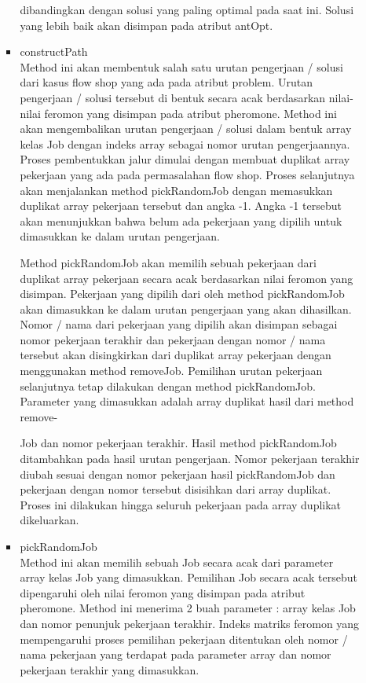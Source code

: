 \begin{itemize}
\begin{itemize}
\begin{itemize}
				dibandingkan dengan solusi yang paling optimal pada saat ini. Solusi yang lebih baik
				akan disimpan pada atribut antOpt.
				\item constructPath \\
				Method ini akan membentuk salah satu urutan pengerjaan / solusi dari kasus flow shop 
				yang ada pada atribut problem. Urutan pengerjaan / solusi tersebut di
				bentuk secara acak berdasarkan nilai-nilai feromon yang disimpan pada atribut pheromone.
				Method ini akan mengembalikan urutan pengerjaan / solusi dalam bentuk
				array kelas Job dengan indeks array sebagai nomor urutan pengerjaannya.
				Proses pembentukkan jalur dimulai dengan membuat duplikat array pekerjaan yang
				ada pada permasalahan flow shop. Proses selanjutnya akan menjalankan
				method pickRandomJob dengan memasukkan duplikat array pekerjaan tersebut dan
				angka -1. Angka -1 tersebut akan menunjukkan bahwa belum ada pekerjaan yang
				dipilih untuk dimasukkan ke dalam urutan pengerjaan.
				
				Method pickRandomJob akan memilih sebuah pekerjaan dari duplikat array pekerjaan
				secara acak berdasarkan nilai feromon yang disimpan. Pekerjaan yang dipilih
				dari oleh method pickRandomJob akan dimasukkan ke dalam urutan pengerjaan
				yang akan dihasilkan. Nomor / nama dari pekerjaan yang dipilih akan disimpan sebagai
				nomor pekerjaan terakhir dan pekerjaan dengan nomor / nama tersebut akan
				disingkirkan dari duplikat array pekerjaan dengan menggunakan method removeJob.
				Pemilihan urutan pekerjaan selanjutnya tetap dilakukan dengan method pickRandomJob.
				Parameter yang dimasukkan adalah array duplikat hasil dari method remove-
				
				Job dan nomor pekerjaan terakhir. Hasil method pickRandomJob ditambahkan pada
				hasil urutan pengerjaan. Nomor pekerjaan terakhir diubah sesuai dengan nomor pekerjaan
				hasil pickRandomJob dan pekerjaan dengan nomor tersebut disisihkan dari
				array duplikat. Proses ini dilakukan hingga seluruh pekerjaan pada array duplikat
				dikeluarkan.
				\item pickRandomJob \\
				Method ini akan memilih sebuah Job secara acak dari parameter array kelas Job
				yang dimasukkan. Pemilihan Job secara acak tersebut dipengaruhi oleh nilai feromon
				yang disimpan pada atribut pheromone. Method ini menerima 2 buah parameter
				: array kelas Job dan nomor penunjuk pekerjaan terakhir. Indeks matriks
				feromon yang mempengaruhi proses pemilihan pekerjaan ditentukan oleh nomor /
				nama pekerjaan yang terdapat pada parameter array dan nomor pekerjaan terakhir
				yang dimasukkan.
				

\end{itemize}
\end{itemize}
\end{itemize}
